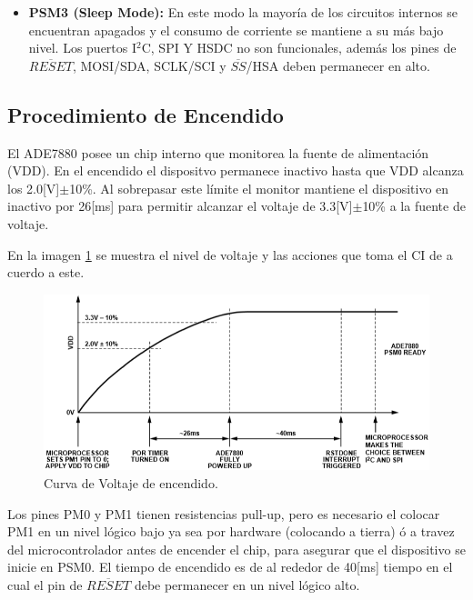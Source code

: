 \documentclass[letterpaper,12pt,oneside]{book}
\begin{document}
\begin{itemize}
				\item \textbf{PSM3 (Sleep Mode):} En este modo la mayoría de los circuitos internos se encuentran apagados y el consumo de corriente se mantiene a su más bajo nivel. Los puertos I$^2$C, SPI Y HSDC no son funcionales, además los pines de $\overline{RESET}$, MOSI/SDA, SCLK/SCI y $\overline{SS}$/HSA deben permanecer en alto.
			\end{itemize}

			\subsection{Procedimiento de Encendido}
			El ADE7880 posee un chip interno que monitorea la fuente de alimentación (VDD). En el encendido el dispositvo permanece inactivo hasta que VDD alcanza los 2.0[V]$\pm$10\%. Al sobrepasar este límite el monitor mantiene el dispositivo en inactivo por 26[ms] para permitir alcanzar el voltaje de 3.3[V]$\pm$10\% a la fuente de voltaje.

			En la imagen \ref{ADEOn} se muestra el nivel de voltaje y las acciones que toma el CI de a cuerdo a este.

			\begin{figure}[!htpb]
				\centering
				\includegraphics[scale = 0.8]{Material de Consulta/Encendido.PNG}
				\caption[Encendido del ADE7880]{Curva de Voltaje de encendido.}
				\label{ADEOn}
			\end{figure}

			Los pines PM0 y PM1 tienen resistencias pull-up, pero es necesario el colocar PM1 en un nivel lógico bajo ya sea por hardware (colocando a tierra) ó a travez del microcontrolador antes de encender el chip, para asegurar que el dispositivo se inicie en PSM0. El tiempo de encendido es de al rededor de 40[ms] tiempo en el cual el pin de $\overline{RESET}$ debe permanecer en un nivel lógico alto.
\end{document}
